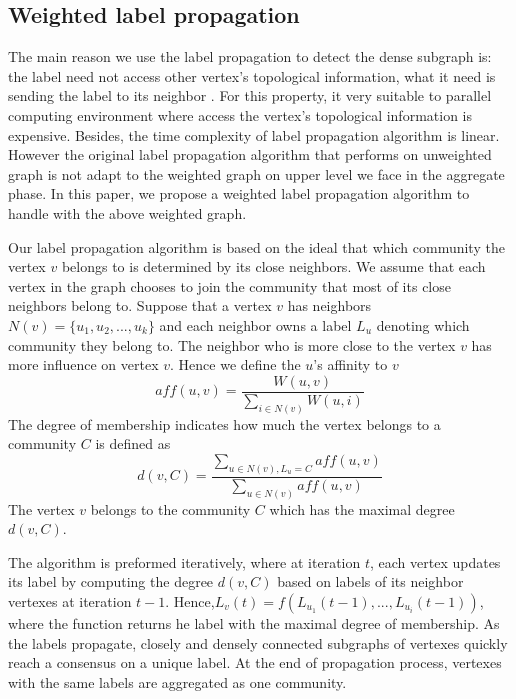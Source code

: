 \documentclass{acm_proc_article-sp}
\begin{document}
\subsection{Weighted label propagation}
The main reason we use the label propagation to detect the dense subgraph is: the label need not access other vertex's topological information, what it need is sending the label to its neighbor \cite{Raghavan2007Near}. For this property, it very suitable to parallel computing environment where access the vertex's topological information is expensive. Besides, the time complexity of label propagation algorithm is linear. However the original label propagation algorithm that performs on unweighted graph is not adapt to the weighted graph on upper level we face in the aggregate phase. In this paper, we propose a weighted label propagation algorithm to handle with the above weighted graph.
\par
Our label propagation algorithm is based on the ideal that which community the vertex $v$ belongs to is determined by its close neighbors. We assume that each vertex in the graph chooses to join the community that most of its close neighbors belong to. Suppose that a vertex $v$ has neighbors $N(v)=\{u_{1},u_{2},...,u_{k}\}$ and each neighbor owns a label $L_{u}$ denoting which community they belong to. The neighbor who is more close to the vertex $v$ has more influence on vertex $v$. Hence we define the $u$'s affinity to $v$
\begin{displaymath}
aff(u,v)=\frac{W(u,v)}{\sum_{i\in N(v)}W(u,i)}
\end{displaymath}
The degree of membership indicates how much the vertex belongs to a community $C$ is defined as
\begin{displaymath}
d(v,C)=\frac{\sum_{u\in N(v),L_{u}=C}aff(u,v)}{\sum_{u\in N(v)}aff(u,v)}
\end{displaymath}
The vertex $v$ belongs to the community $C$ which has the maximal degree $d(v,C)$.
\par
The algorithm is preformed iteratively, where at iteration $t$, each vertex updates its label by computing the degree $d(v,C)$ based on labels of its neighbor vertexes at iteration $t-1$. Hence,$L_{v}(t)=f(L_{u_{1}}(t-1),...,L_{u_{i}}(t-1))$, where the function returns he label with the maximal degree of membership. As the labels propagate, closely and densely connected subgraphs of vertexes quickly reach a consensus on a unique label. At the end of propagation process, vertexes with the same labels are aggregated as one community.
\par
\end{document}
